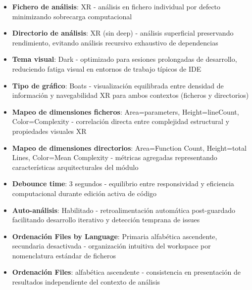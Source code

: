 \documentclass[a4paper, 12pt]{book}
\begin{document}
\begin{itemize}
\begin{itemize}
  \item \textbf{Fichero de análisis}: XR - análisis en fichero individual por defecto minimizando sobrecarga computacional
  \item \textbf{Directorio de análisis}: XR (sin deep) - análisis superficial preservando rendimiento, evitando análisis recursivo exhaustivo de dependencias
  \item \textbf{Tema visual}: Dark - optimizado para sesiones prolongadas de desarrollo, reduciendo fatiga visual en entornos de trabajo típicos de IDE
  \item \textbf{Tipo de gráfico}: Boats - visualización equilibrada entre densidad de información y navegabilidad XR para ambos contextos (ficheros y directorios)
  \item \textbf{Mapeo de dimensiones ficheros}: Area=parameters, Height=lineCount, Color=Complexity - correlación directa entre complejidad estructural y propiedades visuales XR
  \item \textbf{Mapeo de dimensiones directorios}: Area=Function Count, Height=total Lines, Color=Mean Complexity - métricas agregadas representando características arquitecturales del módulo
  \item \textbf{Debounce time}: 3 segundos - equilibrio entre responsividad y eficiencia computacional durante edición activa de código
  \item \textbf{Auto-análisis}: Habilitado - retroalimentación automática post-guardado facilitando desarrollo iterativo y detección temprana de issues
  \item \textbf{Ordenación Files by Language}: Primaria alfabética ascendente, secundaria desactivada - organización intuitiva del workspace por nomenclatura estándar de ficheros
  \item \textbf{Ordenación Files}: alfabética ascendente - consistencia en presentación de resultados independiente del contexto de análisis
\end{itemize}
\end{itemize}
\end{document}

